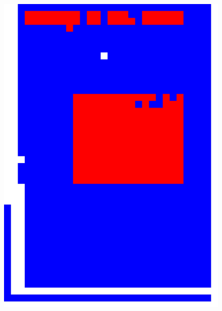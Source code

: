 \documentclass{book}
\begin{document}
\begin{figure}[H]
\begin{center}
\includegraphics[scale=0.06]{images/1g_res_hog_hsv.jpg}

\end{center}
\end{figure}
\end{document}
